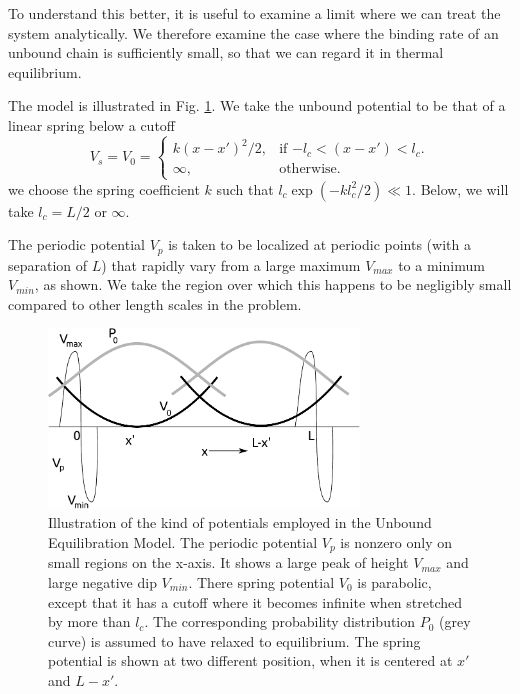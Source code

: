 \documentclass[journal = mamobx, manuscript = article]{achemso}
\begin{document}
To understand this better, it is useful to examine a limit where we can treat
the system analytically. We therefore examine the case where the 
binding rate of an unbound chain is sufficiently small, so that we can regard it in thermal
equilibrium. 

The model is illustrated in Fig. \ref{fig:1dpot}. We take the unbound potential
to be that of a linear spring below a cutoff
\begin{equation}
\label{eq:v0cutoff}
V_s = V_0 =\begin{cases}
k (x - x')^2/2 , & \text{if $-l_c < (x-x')< l_c$}.\\
\infty, & \text{otherwise}.
\end{cases}
\end{equation}
we choose the spring coefficient $k$ such that
$l_c \exp(-k l_c^2/2) \ll 1$.  Below, we will take $l_c = L/2$ or $\infty$.

The periodic potential $V_p$ is taken to be localized at periodic points (with
a separation of $L$) that rapidly vary from a large maximum $V_{max}$ to a
minimum $V_{min}$, as shown. We take the region over which this happens to be
negligibly small compared to other length scales in the problem.

\begin{figure}[htp]
\begin{center}
\includegraphics[width=3.25in]{1dpot}
\caption{
Illustration of the kind of potentials employed in the Unbound Equilibration
Model. The periodic potential $V_p$ is nonzero only on small regions on the
x-axis. It shows a large peak of height $V_{max}$ and large negative dip
$V_{min}$. There spring potential $V_0$ is parabolic, except that it has a
cutoff where it becomes infinite when stretched by more than $l_c$. The
corresponding probability distribution $P_0$ (grey curve) is assumed to have relaxed to
equilibrium. The spring potential is shown at two different position, when it
is centered at $x'$ and $L-x'$.
}
\label{fig:1dpot}
\end{center}
\end{figure}
\end{document}

